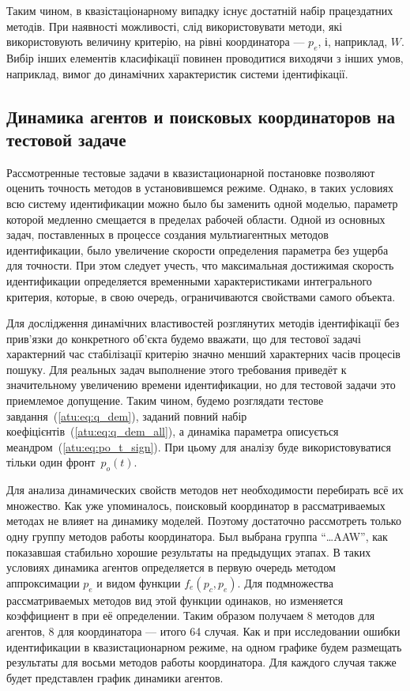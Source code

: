 Таким чином, в квазістаціонарному випадку існує достатній набір працездатних
методів. При наявності можливості, слід використовувати методи, які
використовують величину критерію, на рівні координатора --- $p_e$, і,
наприклад, $W$. Вибір інших елементів класифікації повинен проводитися
виходячи з інших умов, наприклад, вимог до динамічних характеристик системи
ідентифікації.



\subsection{Динамика агентов и поисковых координаторов на тестовой задаче}  %

Рассмотренные тестовые задачи в квазистационарной постановке позволяют оценить
точность методов в установившемся режиме. Однако, в таких условиях
всю систему идентификации можно было бы заменить одной моделью,
параметр которой медленно смещается в пределах рабочей области.
Одной из основных задач, поставленных в процессе создания мультиагентных методов идентификации,
было увеличение скорости определения параметра без ущерба для точности.
При этом следует учесть, что максимальная достижимая скорость идентификации
определяется временными характеристиками интегрального критерия,
которые, в свою очередь, ограничиваются свойствами самого объекта.

Для дослідження динамічних властивостей розглянутих методів ідентифікації без
прив'язки до конкретного об'єкта будемо вважати, що для тестової задачі
характерний час стабілізації критерію значно менший характерних часів процесів
пошуку.
%
Для реальных задач выполнение этого требования приведёт
к значительному увеличению времени идентификации,
но для тестовой задачи это приемлемое допущение.
%
Таким чином, будемо розглядати тестове завдання~(\ref{atu:eq:q_dem}),
заданий повний набір коефіцієнтів~(\ref{atu:eq:q_dem_all}),
а динаміка параметра описується меандром~(\ref{atu:eq:po_t_sign}).
При цьому для аналізу буде використовуватися тільки один фронт~$p_o(t)$.

Для анализа динамических свойств методов нет необходимости перебирать всё их множество.
Как уже упоминалось, поисковый координатор в рассматриваемых методах
не влияет на динамику моделей. Поэтому достаточно рассмотреть
только одну группу методов работы координатора. Был выбрана группа ``\ldots{}AAW'',
как показавшая стабильно хорошие результаты на предыдущих этапах.
В таких условиях динамика агентов определяется в первую очередь
методом аппроксимации $p_e$ и видом функции $f_e(p_c,p_e)$.
Для подмножества рассматриваемых методов вид этой функции одинаков,
но изменяется коэффициент в при её определении.
Таким образом получаем 8 методов для агентов, 8 для координатора --- итого 64 случая.
Как и при исследовании ошибки идентификации в квазистационарном режиме,
на одном графике будем размещать результаты для восьми методов работы координатора.
Для каждого случая также будет представлен график динамики агентов.

